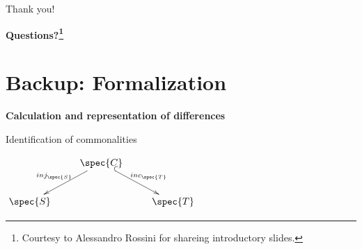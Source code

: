 \documentclass[dvips,slidetop,mathserif,brown]{beamer}
\begin{document}
\begin{frame}{Thank you!}
\vspace{5em}
\begin{center}
	\begin{Huge}
		\textbf{Questions?\footnote{Courtesy to Alessandro Rossini for shareing introductory slides.}}
	\end{Huge}
\end{center}
\vspace{5em}
\end{frame}










\section{Backup: Formalization}

\begin{frame}{}
  \begin{center}
    \begin{Huge}
      \textbf{Calculation and representation of differences}
    \end{Huge}
  \end{center}
\end{frame}

\begin{frame}{Identification of commonalities}
  \begin{center}
    $\xymatrix{
      & \spec{C} \ar@{^{(}->}[dr]^-{inc_{\spec{T}}} \ar[dl]_-{inj_{\spec{S}}} \\
      \spec{S} & & \spec{T}
    }$
  \end{center}
\end{frame}
\end{document}

